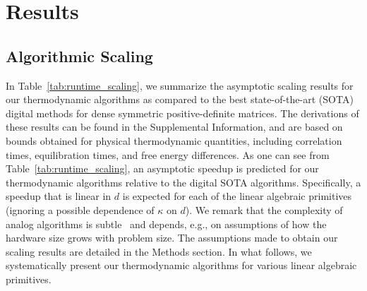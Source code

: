 \documentclass[prx,onecolumn,floatfix,longbibliography,notitlepage, nofootinbib]{revtex4-1}
\begin{document}
\section{Results}





\subsection{Algorithmic Scaling}

In Table~\ref{tab:runtime_scaling}, we summarize the asymptotic scaling results for our thermodynamic algorithms as compared to the best state-of-the-art (SOTA) digital methods for dense symmetric positive-definite matrices. The derivations of these results can be found in the Supplemental Information, and are based on bounds obtained for physical thermodynamic quantities, including correlation times, equilibration times, and free energy differences. As one can see from Table~\ref{tab:runtime_scaling}, an asymptotic speedup is predicted for our thermodynamic algorithms relative to the digital SOTA algorithms. Specifically, a speedup that is linear in $d$ is expected for each of the linear algebraic primitives (ignoring a possible dependence of $\kappa$ on $d$). We remark that the complexity of analog algorithms is subtle~\cite{valiant2023matrix} and depends, e.g., on assumptions of how the hardware size grows with problem size. The assumptions made to obtain our scaling results are detailed in the Methods section. In what follows, we systematically present our thermodynamic algorithms for various linear algebraic primitives.
\end{document}
